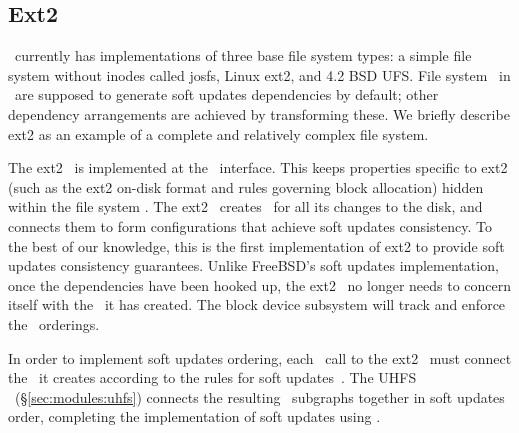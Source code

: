 \subsection{Ext2}
\label{sec:modules:ext2}

\Kudos\ currently has implementations of three base file system types: a simple
file system without inodes called josfs, Linux ext2, and 4.2 BSD UFS. File
system \modules\ in \Kudos\ are supposed to generate soft updates dependencies
by default; other dependency arrangements are achieved by transforming these.
We briefly describe ext2 as an example of a complete and relatively complex file
system.

The ext2 \module\ is implemented at the \LFS\ interface. This keeps properties
specific to ext2 (such as the ext2 on-disk format and rules governing block
allocation) hidden within the file system \module. The ext2 \module\ creates
\chdescs\ for all its changes to the disk, and connects them to form
configurations that achieve soft updates consistency. To the best of our
knowledge, this is the first implementation of ext2 to provide soft updates
consistency guarantees. Unlike FreeBSD's soft updates implementation, once the
dependencies have been hooked up, the ext2 \module\ no longer needs to concern
itself with the \chdescs\ it has created. The block device subsystem will track
and enforce the \chdesc\ orderings.

In order to implement soft updates ordering, each \LFS\ call to the ext2
\module\ must connect the \chdescs\ it creates according to the rules for soft
updates~\cite{ganger00soft}. The UHFS \module\ (\S\ref{sec:modules:uhfs})
connects the resulting \chdesc\ subgraphs together in soft updates order,
completing the implementation of soft updates using \chdescs.
